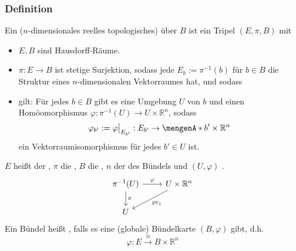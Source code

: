 \subsubsection[Definition: Vektorraumbündel]{Definition} %
\label{ssub:431}
Ein ($n$-dimensionales reelles topologisches)  über $B$ ist ein Tripel $(E,\pi, B)$ mit
\begin{itemize}
	\item $E,B$ sind Hausdorff-Räume. 
	\item $\pi : E \to B$ ist stetige Surjektion, sodass jede  $E_b := \pi ^{-1}(b)$ für $b \in B$ die Struktur eines $n$-dimensionalen Vektorraumes 
	hat, und sodass
	\item {} gilt: Für jedes $b \in B$ gibt es eine Umgebung $U$ von $b$ und einen Homöomorphismus $\varphi : \pi^{-1}(U) \to U\times \mathds{R}^n$,
	sodass  
	\[
		\varphi_{b'} := \varphi\big|_{E_{b'}} : E_{b'} \to \set{b'} \times \mathds{R}^n 
	\]
	ein Vektorraumisomorphismus für jedes $b' \in U$ ist.
\end{itemize}
$E$ heißt der , $\pi $ die , $B$ die , $n$ der  des Bündels und $(U,\varphi)$ .
\[
	\begin{tikzcd}
		\pi ^{-1}(U) \rar{\varphi} \dar{\pi}& U \times \mathds{R}^n \dlar{\mathrm{pr}_1} \\
		U &
	\end{tikzcd}
\]
Ein Bündel heißt , falls es eine (globale) Bündelkarte $(B,\varphi)$ gibt, d.h. 
\[
	\varphi : E \xrightarrow{\cong} B \times \mathds{R}^n 
\]
